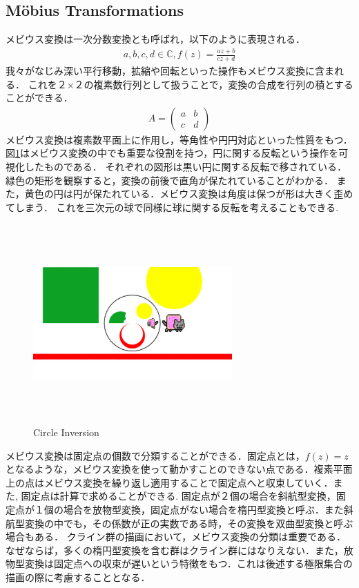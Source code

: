 \subsection{M\"obius Transformations}
メビウス変換は一次分数変換とも呼ばれ，以下のように表現される．
\begin{eqnarray*}
 a, b, c, d\in \mathbb{C}, f(z) = \frac{az + b}{cz + d}
\end{eqnarray*}
我々がなじみ深い平行移動，拡縮や回転といった操作もメビウス変換に含まれる．
これを２×２の複素数行列として扱うことで，変換の合成を行列の積とすることができる．
\begin{eqnarray*}
  A = \left(
    \begin{array}{ccc}
      a & b \\
      c & d
    \end{array}
  \right)
\end{eqnarray*}
メビウス変換は複素数平面上に作用し，等角性や円円対応といった性質をもつ．
図\ref{fig:circleInversion}はメビウス変換の中でも重要な役割を持つ，円に関する反転という操作を可視化したものである．
それぞれの図形は黒い円に関する反転で移されている．緑色の矩形を観察すると，変換の前後で直角が保たれていることがわかる．
また，黄色の円は円が保たれている．メビウス変換は角度は保つが形は大きく歪めてしまう．
これを三次元の球で同様に球に関する反転を考えることもできる.
\begin{figure}[htbp]
 \begin{center}
      \includegraphics[width=3in, height=3in, keepaspectratio]{../img/klein/circleInversion.pdf}
    \caption{Circle Inversion}
    \label{fig:circleInversion}
 \end{center}
\end{figure}

メビウス変換は固定点の個数で分類することができる．固定点とは，$f(z) = z$となるような，メビウス変換を使って動かすことのできない点である．複素平面上の点はメビウス変換を繰り返し適用することで固定点へと収束していく．また, 固定点は計算で求めることができる.
固定点が２個の場合を斜航型変換，固定点が１個の場合を放物型変換，固定点がない場合を楕円型変換と呼ぶ．また斜航型変換の中でも，その係数が正の実数である時，その変換を双曲型変換と呼ぶ場合もある．
クライン群の描画において，メビウス変換の分類は重要である．なぜならば，多くの楕円型変換を含む群はクライン群にはなりえない．また，放物型変換は固定点への収束が遅いという特徴をもつ．これは後述する極限集合の描画の際に考慮することとなる．

